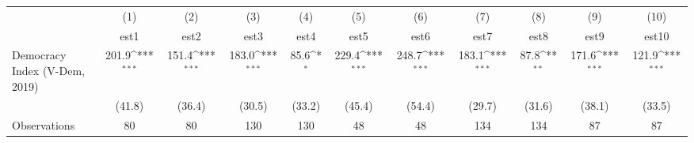 {
\def\sym#1{\ifmmode^{#1}\else\(^{#1}\)\fi}
\begin{tabular}{l*{10}{c}}
                &\multicolumn{1}{c}{(1)}         &\multicolumn{1}{c}{(2)}         &\multicolumn{1}{c}{(3)}         &\multicolumn{1}{c}{(4)}         &\multicolumn{1}{c}{(5)}         &\multicolumn{1}{c}{(6)}         &\multicolumn{1}{c}{(7)}         &\multicolumn{1}{c}{(8)}         &\multicolumn{1}{c}{(9)}         &\multicolumn{1}{c}{(10)}         \\
                &     est1         &     est2         &     est3         &     est4         &     est5         &     est6         &     est7         &     est8         &     est9         &    est10         \\
Democracy Index (V-Dem, 2019)&    201.9\sym{***}&    151.4\sym{***}&    183.0\sym{***}&     85.6\sym{*}  &    229.4\sym{***}&    248.7\sym{***}&    183.1\sym{***}&     87.8\sym{**} &    171.6\sym{***}&    121.9\sym{***}\\
                &   (41.8)         &   (36.4)         &   (30.5)         &   (33.2)         &   (45.4)         &   (54.4)         &   (29.7)         &   (31.6)         &   (38.1)         &   (33.5)         \\
Observations    &       80         &       80         &      130         &      130         &       48         &       48         &      134         &      134         &       87         &       87         \\
\end{tabular}
}
